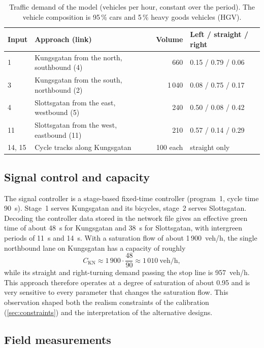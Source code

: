 \documentclass[11pt,a4paper]{article}
\begin{document}
\begin{table}[!htb]
\centering
\caption[Traffic demand of the model]{Traffic demand of the model (vehicles per hour, constant over
the period). The vehicle composition is 95\,\% cars and 5\,\% heavy goods vehicles (HGV).}
\label{tab:demand}
\small
\begin{tabular}{llrl}
\toprule
\textbf{Input} & \textbf{Approach (link)} & \textbf{Volume} & \textbf{Left / straight / right}\\
\midrule
1      & Kungsgatan from the north, southbound (4)  & 660      & 0.15 / 0.79 / 0.06\\
3      & Kungsgatan from the south, northbound (2)  & 1\,040   & 0.08 / 0.75 / 0.17\\
4      & Slottsgatan from the east, westbound (5)   & 240      & 0.50 / 0.08 / 0.42\\
11     & Slottsgatan from the west, eastbound (11)  & 210      & 0.57 / 0.14 / 0.29\\
14, 15 & Cycle tracks along Kungsgatan              & 100 each & straight only\\
\bottomrule
\end{tabular}
\end{table}

\subsection{Signal control and capacity}

The signal controller is a stage-based fixed-time controller (program~1, cycle time 90~s). Stage~1
serves Kungsgatan and its bicycles, stage~2 serves Slottsgatan. Decoding the controller data stored
in the network file gives an effective green time of about 48~s for Kungsgatan and 38~s for
Slottsgatan, with intergreen periods of 11~s and 14~s. With a saturation flow of about
1\,900~veh/h, the single northbound lane on Kungsgatan has a capacity of roughly
\begin{equation}
C_{\mathrm{KN}} \approx 1\,900 \cdot \frac{48}{90} \approx 1\,010~\text{veh/h},
\end{equation}
while its straight and right-turning demand passing the stop line is 957~veh/h. This approach
therefore operates at a degree of saturation of about 0.95 and is very sensitive to every parameter
that changes the saturation flow. This observation shaped both the realism constraints of the
calibration (\cref{sec:constraints}) and the interpretation of the alternative designs.

\subsection{Field measurements}
\end{document}
